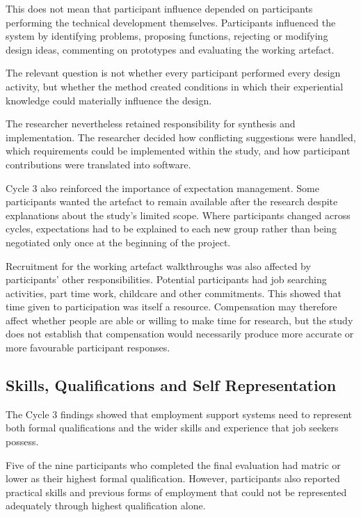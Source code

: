 This does not mean that participant influence depended on participants performing the technical development themselves. Participants influenced the system by identifying problems, proposing functions, rejecting or modifying design ideas, commenting on prototypes and evaluating the working artefact.

The relevant question is not whether every participant performed every design activity, but whether the method created conditions in which their experiential knowledge could materially influence the design.

The researcher nevertheless retained responsibility for synthesis and implementation. The researcher decided how conflicting suggestions were handled, which requirements could be implemented within the study, and how participant contributions were translated into software.

Cycle 3 also reinforced the importance of expectation management. Some participants wanted the artefact to remain available after the research despite explanations about the study's limited scope. Where participants changed across cycles, expectations had to be explained to each new group rather than being negotiated only once at the beginning of the project.

Recruitment for the working artefact walkthroughs was also affected by participants' other responsibilities. Potential participants had job searching activities, part time work, childcare and other commitments. This showed that time given to participation was itself a resource. Compensation may therefore affect whether people are able or willing to make time for research, but the study does not establish that compensation would necessarily produce more accurate or more favourable participant responses.


\subsection{Skills, Qualifications and Self Representation}

The Cycle 3 findings showed that employment support systems need to represent both formal qualifications and the wider skills and experience that job seekers possess.

Five of the nine participants who completed the final evaluation had matric or lower as their highest formal qualification. However, participants also reported practical skills and previous forms of employment that could not be represented adequately through highest qualification alone.

